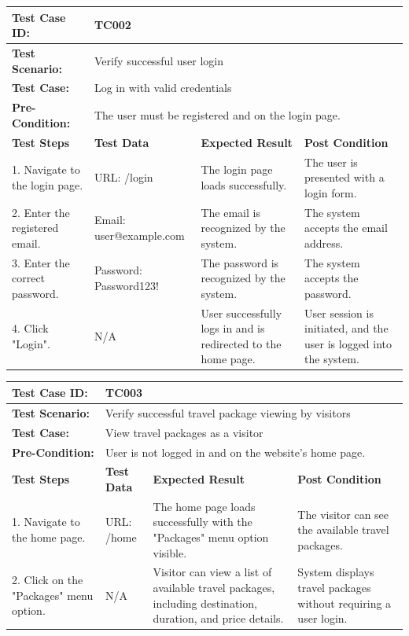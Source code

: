 \documentclass{scrreprt}
\begin{document}
\begin{longtable}{| m{2cm} | m{5cm} | m{4cm} | m{3cm} |}
\hline

\textbf{Test Case ID:} & \multicolumn{3}{l|}{TC002} \\ \hline
\textbf{Test Scenario:} & \multicolumn{3}{l|}{Verify successful user login} \\ \hline
\textbf{Test Case:} & \multicolumn{3}{l|}{Log in with valid credentials} \\ \hline
\textbf{Pre-Condition:} & \multicolumn{3}{l|}{The user must be registered and on the login page.} \\ \hline
\textbf{Test Steps} & \textbf{Test Data} & \textbf{Expected Result} & \textbf{Post Condition} \\ \hline
1. Navigate to the login page. & URL: /login & The login page loads successfully. & The user is presented with a login form. \\ \hline
2. Enter the registered email. & Email: user@example.com & The email is recognized by the system. & The system accepts the email address. \\ \hline
3. Enter the correct password. & Password: Password123! & The password is recognized by the system. & The system accepts the password. \\ \hline
4. Click "Login". & N/A & User successfully logs in and is redirected to the home page. & User session is initiated, and the user is logged into the system. \\ \hline
\end{longtable}

\vspace{1cm}

\begin{longtable}{| m{2cm} | m{5cm} | m{4cm} | m{3cm} |}
\hline

\textbf{Test Case ID:} & \multicolumn{3}{l|}{TC003} \\ \hline
\textbf{Test Scenario:} & \multicolumn{3}{l|}{Verify successful travel package viewing by visitors} \\ \hline
\textbf{Test Case:} & \multicolumn{3}{l|}{View travel packages as a visitor} \\ \hline
\textbf{Pre-Condition:} & \multicolumn{3}{l|}{User is not logged in and on the website's home page.} \\ \hline
\textbf{Test Steps} & \textbf{Test Data} & \textbf{Expected Result} & \textbf{Post Condition} \\ \hline
1. Navigate to the home page. & URL: /home & The home page loads successfully with the "Packages" menu option visible. & The visitor can see the available travel packages. \\ \hline
2. Click on the "Packages" menu option. & N/A & Visitor can view a list of available travel packages, including destination, duration, and price details. & System displays travel packages without requiring a user login. \\ \hline
\end{longtable}
\end{document}
